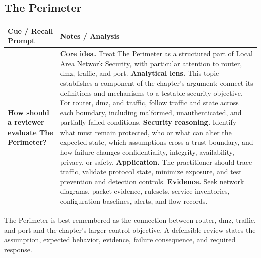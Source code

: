 \documentclass[11pt]{article}
\newcommand{\CornellHeader}{%
\rowcolor{Navy}\color{white}\bfseries Cue / Recall Prompt & \color{white}\bfseries Notes / Analysis\\\hline}
\newcommand{\CornellRow}[2]{%
\cellcolor{CueGray}\RaggedRight\textbf{#1} & \RaggedRight #2\\\hline}
\begin{document}
\subsection*{The Perimeter}
\begin{longtable}{>{\RaggedRight\arraybackslash}p{}|>{\RaggedRight\arraybackslash}p{}}
\CornellHeader
\CornellRow{How should a reviewer evaluate The Perimeter?}{\textbf{Core idea.} Treat The Perimeter as a structured part of Local Area Network Security, with particular attention to router, dmz, traffic, and port. \textbf{Analytical lens.} This topic establishes a component of the chapter's argument; connect its definitions and mechanisms to a testable security objective. For router, dmz, and traffic, follow traffic and state across each boundary, including malformed, unauthenticated, and partially failed conditions. \textbf{Security reasoning.} Identify what must remain protected, who or what can alter the expected state, which assumptions cross a trust boundary, and how failure changes confidentiality, integrity, availability, privacy, or safety. \textbf{Application.} The practitioner should trace traffic, validate protocol state, minimize exposure, and test prevention and detection controls. \textbf{Evidence.} Seek network diagrams, packet evidence, rulesets, service inventories, configuration baselines, alerts, and flow records.}
\end{longtable}
\begin{topicsummary}
The Perimeter is best remembered as the connection between router, dmz, traffic, and port and the chapter's larger control objective. A defensible review states the assumption, expected behavior, evidence, failure consequence, and required response.
\end{topicsummary}
\end{document}
